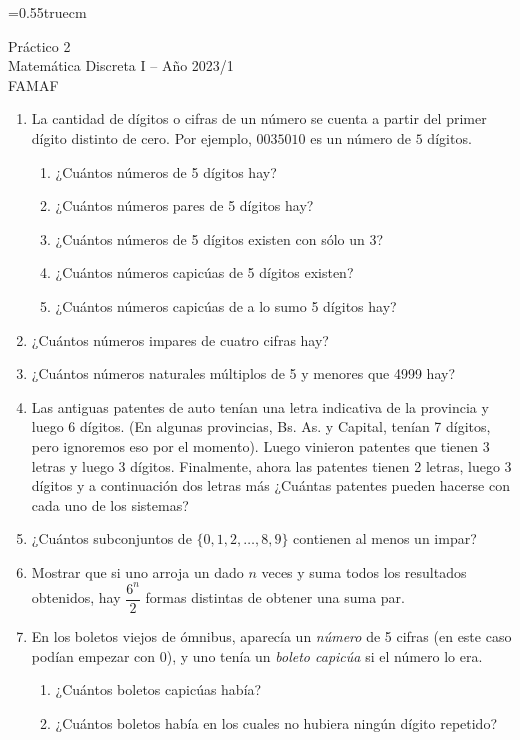 \documentclass[a4paper,12pt,twoside,spanish,reqno]{amsbook}
\numberwithin{equation}{section}
\begin{document}
    \baselineskip=0.55truecm %
    


{\bf \begin{center} \large  Práctico 2 \\ Matemática Discreta I -- Año 2023/1 \\ FAMAF \end{center}}


\begin {enumerate}
\setlength\itemsep{1.1em}

\item La cantidad de dígitos o cifras de un número se cuenta a partir del primer dígito distinto de cero. Por ejemplo, $0035010$ es un número de $5$ dígitos.
\begin{enumerate}
\item ¿Cuántos números de 5 dígitos hay?
\item ¿Cuántos números pares de 5 dígitos  hay?
\item ¿Cuántos números de 5 dígitos existen con sólo un 3?
\item ¿Cuántos números capicúas de 5 dígitos existen?
\item ¿Cuántos números capicúas de a lo sumo 5 dígitos hay?
\end{enumerate}


\item ¿Cuántos números impares de cuatro cifras hay?


\item ¿Cuántos números naturales múltiplos de  5 y menores que 4999 hay?


\item Las antiguas patentes de auto tenían una letra indicativa de la provincia y luego 6 dígitos. (En algunas provincias, Bs. As. y Capital, tenían 7 dígitos, pero ignoremos eso por el momento). Luego  vinieron patentes que tienen 3 letras y luego 3 dígitos. Finalmente, ahora las patentes tienen 2 letras, luego 3 dígitos y a continuación dos letras más ¿Cuántas patentes pueden hacerse con cada uno de los sistemas?


\item ¿Cuántos subconjuntos de $\{0,1,2,\dots,8,9\}$ contienen al menos un impar?


\item Mostrar que si uno arroja un dado $n$ veces y suma todos los resultados obtenidos, hay $\dfrac{6^n}{2}$ formas distintas de obtener una suma par.


\item En los boletos viejos de ómnibus, aparecía un {\em número} de 5 cifras (en este caso podían empezar con 0), y uno tenía un {\it boleto capicúa} si el número lo era.
\begin{enumerate}
	\item ¿Cuántos boletos capicúas había?
	\item ¿Cuántos boletos había en los cuales no hubiera ningún dígito repetido?
\end{enumerate}



\end{enumerate}
\end{document}
